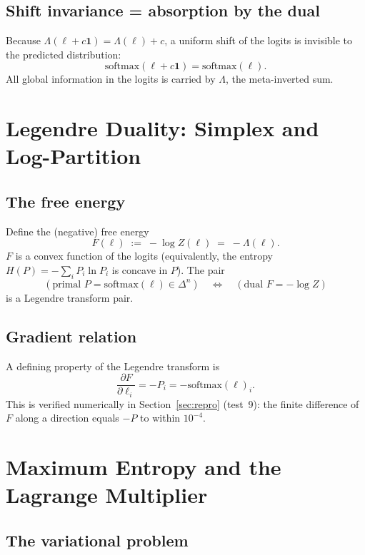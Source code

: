 \documentclass[11pt]{article}
\newcommand{\simplex}[1]{\Delta^{#1}}
\newcommand{\softmax}{\mathrm{softmax}}
\begin{document}
\subsection{Shift invariance = absorption by the dual}
\label{sec:meta-shift}

Because $\Lambda(\ell+c\mathbf{1}) = \Lambda(\ell) + c$, a uniform shift of the
logits is invisible to the predicted distribution:
\[
\softmax(\ell + c\mathbf{1}) = \softmax(\ell).
\]
All global information in the logits is carried by $\Lambda$, the meta-inverted
sum.

\section{Legendre Duality: Simplex and Log-Partition}
\label{sec:legendre}

\subsection{The free energy}
\label{sec:legendre-free}

Define the (negative) free energy
\[
F(\ell) \;:=\; -\log Z(\ell) \;=\; -\Lambda(\ell).
\]
$F$ is a convex function of the logits (equivalently, the entropy
$H(P)=-\sum_i P_i\ln P_i$ is concave in $P$). The pair
\[
(\text{primal } P = \softmax(\ell)\in\simplex{n})
\quad\Longleftrightarrow\quad
(\text{dual } F = -\log Z)
\]
is a Legendre transform pair.

\subsection{Gradient relation}
\label{sec:legendre-grad}

A defining property of the Legendre transform is
\[
\frac{\partial F}{\partial \ell_i}
= -P_i
= -\softmax(\ell)_i.
\]
This is verified numerically in Section~\ref{sec:repro} (test~9): the finite
difference of $F$ along a direction equals $-P$ to within $10^{-4}$.

\section{Maximum Entropy and the Lagrange Multiplier}
\label{sec:maxent}

\subsection{The variational problem}
\label{sec:maxent-var}
\end{document}
